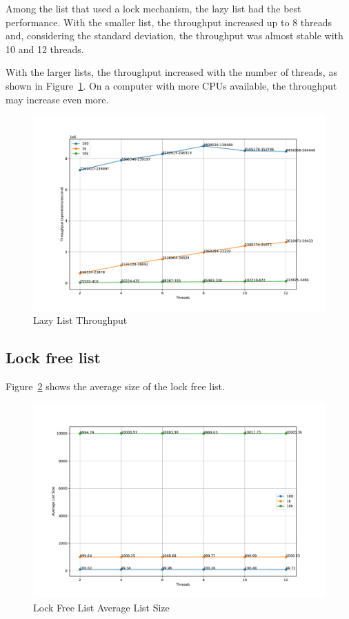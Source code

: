 \documentclass{article}
\begin{document}
Among the list that used a lock mechanism, the lazy list had the best performance. With the smaller list, the throughput increased up to 8 threads and, considering the standard deviation, the throughput was almost stable with 10 and 12 threads.

With the larger lists, the throughput increased with the number of threads, as shown in Figure~\ref{fig:lazy-throughput}. On a computer with more CPUs available, the throughput may increase even more.

\begin{figure}[H]
    \centering
    \includegraphics[width=\textwidth]{../test/plots/LazyListThroughput.pdf}
    \caption{Lazy List Throughput}
    \label{fig:lazy-throughput}
\end{figure}

\subsection{Lock free list}

Figure~\ref{fig:lock-free-size} shows the average size of the lock free list.

\begin{figure}[H]
    \centering
    \includegraphics[scale=0.3]{../test/plots/LockFreeListAverageListSize.pdf}
    \caption{Lock Free List Average List Size}
    \label{fig:lock-free-size}
\end{figure}
\end{document}
